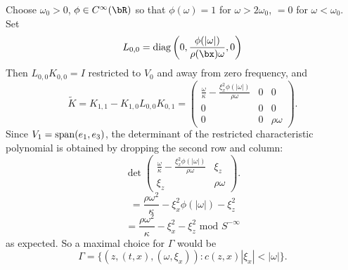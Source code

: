 Choose $\omega_0>0$, $\phi \in C^{\infty}(\bR)$ so that $\phi(\omega) = 1$ for $\omega> 2\omega_0$, $=0$ for $\omega < \omega_0$. Set
\[
  L_{0,0}= {\rm diag}\left(0, \frac{\phi(|\omega|)}{\rho(\bx) \omega}, 0\right)
\]
Then $L_{0,0}K_{0,0} = I$ restricted to $V_0$ and away from zero frequency, and
\[
  \tilde{K} = K_{1,1} - K_{1,0}L_{0,0}K_{0,1} =
  \left(
    \begin{array}{ccc}
      \frac{\omega}{\kappa} - \frac{\xi_x^2\phi(|\omega|)}{\rho \omega} & 0 & 0\\
      0 & 0  & 0 \\
      0 & 0 & \rho \omega
    \end{array}
  \right).
\]
Since $V_1={\rm span}(e_1,e_3)$, the determinant of the restricted characteristic polynomial is obtained by dropping the second row and column:
\[
  \det
  \left(
    \begin{array}{cc}
      \frac{\omega}{\kappa} - \frac{\xi_x^2\phi(|\omega|)}{\rho \omega} &  \xi_z\\
      \xi_z &  \rho \omega
    \end{array}
  \right).
\]
\[
  = \frac{\rho \omega^2 }{\kappa} - \xi_x^2\phi(|\omega|) - \xi_z^2
\]
\[
  = \frac{\rho \omega^2 }{\kappa} - \xi_x^2 - \xi_z^2 \mbox{ mod }  S^{-\infty}
\]  
as expected. So a maximal choice for $\Gamma$ would be
\[
  \Gamma = \{(z,(t,x),(\omega,\xi_x)): c(z,x)|\xi_x| < |\omega|\}.
\]





